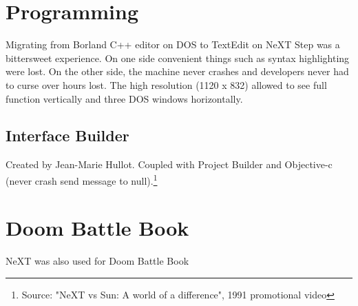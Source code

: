 
\section{Programming}
Migrating from Borland C++ editor on DOS to TextEdit on NeXT Step was a bittersweet experience. On one side convenient things such as syntax highlighting were lost. On the other side, the machine never crashes and developers never had to curse over hours lost. The high resolution (1120 x 832) allowed to see full function vertically and three DOS windows horizontally. \\
\par
{}
\par
{}

\subsection{Interface Builder}
Created by Jean-Marie Hullot. Coupled with Project Builder and Objective-c (never crash send message to null).\footnote{Source: "NeXT vs Sun: A world of a difference", 1991 promotional video}

\par
\section{Doom Battle Book}
NeXT was also used for Doom Battle Book\\
